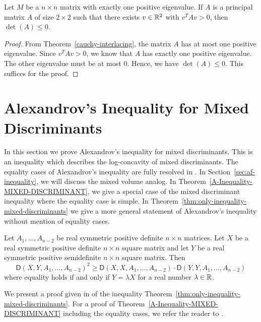 \documentclass{puthesis-UG}
\begin{document}
\begin{cor}
	Let $M$ be a $n \times n$ matrix with exactly one positive eigenvalue. If $A$ is a principal matrix $A$ of size $2 \times 2$ such that there exists $v \in \mathbb{R}^2$ with $v^T A v > 0$, then $\det (A) \leq 0$. 
\end{cor}

\begin{proof}
	From Theorem~\ref{cauchy-interlacing}, the matrix $A$ has at most one positive eigenvalue. Since $v^T A v > 0$, we know that $A$ has exactly one positive eigenvalue. The other eigenvalue must be at most $0$. Hence, we have $\det (A) \leq 0$. This suffices for the proof. 
\end{proof}

\section{Alexandrov's Inequality for Mixed Discriminants} \label{sec:a-inequality}

In this section we prove Alexandrov's inequality for mixed discriminants. This is an inequality which describes the log-concavity of mixed discriminants. The equality cases of Alexandrov's inequality are fully resolved in \cite{Panov_1987}. In Section~\ref{sec:af-inequality}, we will discuss the mixed volume analog. In Theorem~\ref{A-Inequality-MIXED-DISCRIMINANT}, we give a special case of the mixed discriminant inequality where the equality case is simple. In Theorem~\ref{thm:only-inequality-mixed-discriminants} we give a more general statement of Alexandrov's inequality without mention of equality cases. 

\begin{thm}  \label{A-Inequality-MIXED-DISCRIMINANT}
	Let $A_1, \ldots, A_{n-2}$ be real symmetric positive definite $n \times n$ matrices. Let $X$ be a real symmetric positive definite $n \times n$ square matrix and let $Y$ be a real symmetric positive semidefinite $n \times n$ square matrix. Then 
	\[
		\mathsf{D}(X, Y, A_1, \ldots, A_{n-2})^2 \geq \mathsf{D}(X, X, A_1, \ldots, A_{n-2}) \cdot \mathsf{D} (Y, Y, A_1, \ldots, A_{n-2})
	\]
	where equality holds if and only if $Y = \lambda X$ for a real number $\lambda \in \mathbb{R}$. 
\end{thm}

We present a proof given in \cite{bochner} of the inequality Theorem~\ref{thm:only-inequality-mixed-discriminants}. For a proof of Theorem~\ref{A-Inequality-MIXED-DISCRIMINANT} including the equality cases, we refer the reader to \cite{Panov_1987}. 
\end{document}
